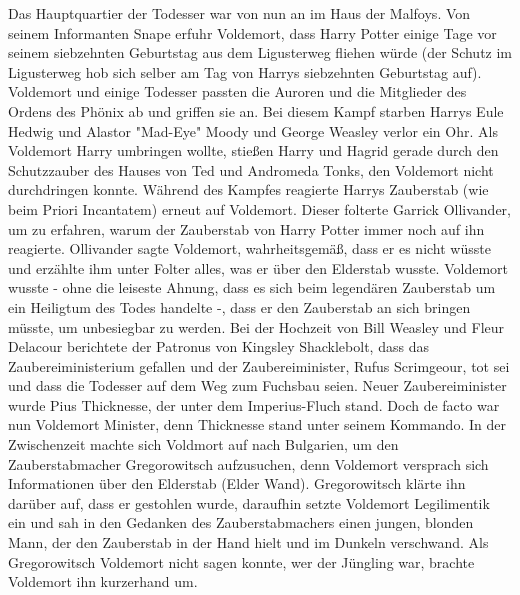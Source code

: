 \documentclass[a4paper, 10pt]{article}
\begin{document}
\vspace{10pt}
\newline
{}  
Das Hauptquartier der Todesser war von nun an im Haus der Malfoys. Von seinem Informanten Snape erfuhr Voldemort, dass Harry Potter einige Tage vor seinem siebzehnten Geburtstag aus dem Ligusterweg fliehen würde (der Schutz im Ligusterweg hob sich selber am Tag von Harrys siebzehnten Geburtstag auf). Voldemort und einige Todesser passten die Auroren und die Mitglieder des Ordens des Phönix ab und griffen sie an. Bei diesem Kampf starben Harrys Eule Hedwig und Alastor "Mad-Eye" Moody und George Weasley verlor ein Ohr. Als Voldemort Harry umbringen wollte, stießen Harry und Hagrid gerade durch den Schutzzauber des Hauses von Ted und Andromeda Tonks, den Voldemort nicht durchdringen konnte.
\vspace{10pt}
\newline
{}  
Während des Kampfes reagierte Harrys Zauberstab (wie beim Priori Incantatem) erneut auf Voldemort. Dieser folterte Garrick Ollivander, um zu erfahren, warum der Zauberstab von Harry Potter immer noch auf ihn reagierte. Ollivander sagte Voldemort, wahrheitsgemäß, dass er es nicht wüsste und erzählte ihm unter Folter alles, was er über den Elderstab wusste. Voldemort wusste - ohne die leiseste Ahnung, dass es sich beim legendären Zauberstab um ein Heiligtum des Todes handelte -, dass er den Zauberstab an sich bringen müsste, um unbesiegbar zu werden.
\vspace{10pt}
\newline
{}  
Bei der Hochzeit von Bill Weasley und Fleur Delacour berichtete der Patronus von Kingsley Shacklebolt, dass das Zaubereiministerium gefallen und der Zaubereiminister, Rufus Scrimgeour, tot sei und dass die Todesser auf dem Weg zum Fuchsbau seien.
\vspace{10pt}
\newline
{}  
Neuer Zaubereiminister wurde Pius Thicknesse, der unter dem Imperius-Fluch stand. Doch de facto war nun Voldemort Minister, denn Thicknesse stand unter seinem Kommando.
\vspace{10pt}
\newline
{}  
In der Zwischenzeit machte sich Voldmort auf nach Bulgarien, um den Zauberstabmacher Gregorowitsch aufzusuchen, denn Voldemort versprach sich Informationen über den Elderstab (Elder Wand). Gregorowitsch klärte ihn darüber auf, dass er gestohlen wurde, daraufhin setzte Voldemort Legilimentik ein und sah in den Gedanken des Zauberstabmachers einen jungen, blonden Mann, der den Zauberstab in der Hand hielt und im Dunkeln verschwand. Als Gregorowitsch Voldemort nicht sagen konnte, wer der Jüngling war, brachte Voldemort ihn kurzerhand um.
\end{document}

